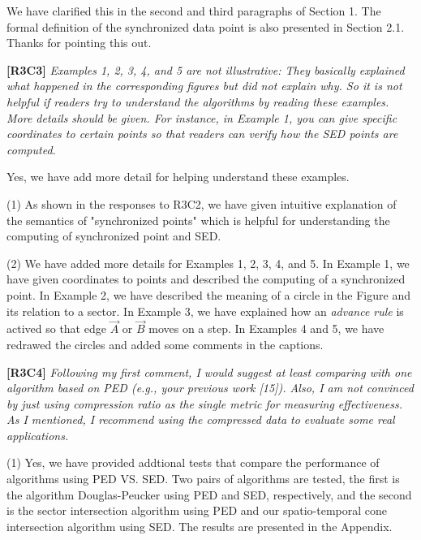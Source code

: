 \documentclass{letter}
\begin{document}
We have clarified this in the second and third paragraphs of Section 1. The formal definition of the synchronized data point is also presented in Section 2.1.
Thanks for pointing this out.



\textbf{[R3C3]} \emph{Examples 1, 2, 3, 4, and 5 are not illustrative: They basically explained what happened in the corresponding figures but did not explain why. So it is not helpful if readers try to understand the algorithms by reading these examples. More details should be given. For instance, in Example 1, you can give specific coordinates to certain points so that readers can verify how the SED points are computed.}

Yes, we have add more detail for helping understand these examples. 

(1) As shown in the responses to R3C2, we have given intuitive explanation of the semantics of "synchronized points" which is helpful for understanding the computing of synchronized point and SED.

(2) We have added more details for Examples 1, 2, 3, 4, and 5. In Example 1, we have given coordinates to points and described the computing of a synchronized point. In Example 2, we have described the meaning of a circle in the Figure and its relation to a sector. In Example 3, we have explained how an \emph{advance rule} is actived so that edge $\overrightarrow{A}$ or $\overrightarrow{B}$ moves on a step. In Examples 4 and 5, we have redrawed the circles and added some comments in the captions.

\textbf{[R3C4]} \emph{Following my first comment, I would suggest at least comparing with one algorithm based on PED (e.g., your previous work [15]). Also, I am not convinced by just using compression ratio as the single metric for measuring effectiveness. As I mentioned, I recommend using the compressed data to evaluate some real applications.}

(1) Yes, we have provided addtional tests that compare the performance of algorithms using PED VS. SED. Two pairs of algorithms are tested, the first is the algorithm Douglas-Peucker using PED and SED, respectively, and the second is the sector intersection algorithm using PED and our spatio-temporal cone intersection algorithm using SED. %
The results are presented in the Appendix.
\end{document}
